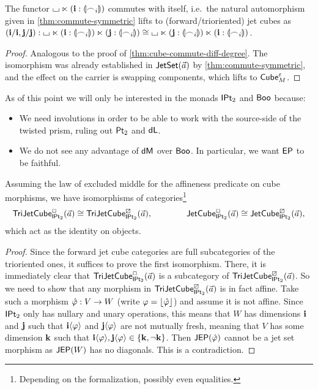 \documentclass[a4paper]{article}
\begin{document}
\begin{proposition} \label{thm:cube-commute-symmetric}
	The functor ${\llcorner\hspace{-.4ex}\lrcorner} \ltimes (\mathbf{i} : {\llparenthesis \frown_i \rrparenthesis})$ commutes with itself, i.e.\ the natural automorphism given in \cref{thm:commute-symmetric} lifts to (forward/trioriented) jet cubes as $(\mathbf{i} / \mathbf{i}, \mathbf{j} / \mathbf{j}) : {\llcorner\hspace{-.4ex}\lrcorner} \ltimes (\mathbf{i} : {\llparenthesis \frown_i \rrparenthesis}) \ltimes (\mathbf{j} : {\llparenthesis \frown_i \rrparenthesis}) \cong {\llcorner\hspace{-.4ex}\lrcorner} \ltimes (\mathbf{j} : {\llparenthesis \frown_i \rrparenthesis}) \ltimes (\mathbf{i} : {\llparenthesis \frown_i \rrparenthesis})$.
\end{proposition}
\begin{proof}
	Analogous to the proof of \cref{thm:cube-commute-diff-degree}.
	The isomorphism was already established in $\mathsf{JetSet}(\vec a)$ by \cref{thm:commute-symmetric}, and the effect on the carrier is swapping components, which lifts to ${\mathsf{Cube}}_M^\varepsilon$.
\end{proof}
\begin{remark} \label{rem:two-monads}
	As of this point we will only be interested in the monads ${\mathsf{IPt}_2}$ and $\mathsf{Boo}$ because:
	\begin{itemize}
		\item We need involutions in order to be able to work with the source-side of the twisted prism, ruling out ${\mathsf{Pt}_2}$ and $\mathsf{dL}$.
		\item We do not see any advantage of $\mathsf{dM}$ over $\mathsf{Boo}$. In particular, we want $\mathsf{EP}$ to be faithful.
	\end{itemize}
\end{remark}
\begin{theorem} \label{thm:affine-automatic}
	Assuming the law of excluded middle for the affineness predicate on cube morphisms, we have isomorphisms of categories\footnote{Depending on the formalization, possibly even equalities.}
	\[
		\mathsf{TriJetCube}^{\Box}_{{\mathsf{IPt}_2}}\mathopen{}\left( \vec a \right)\mathclose{} \cong \mathsf{TriJetCube}^{\boxslash}_{{\mathsf{IPt}_2}}\mathopen{}\left( \vec a \right)\mathclose{},
		\qquad \qquad
		\mathsf{JetCube}^{\Box}_{{\mathsf{IPt}_2}}\mathopen{}\left( \vec a \right)\mathclose{} \cong \mathsf{JetCube}^{\boxslash}_{{\mathsf{IPt}_2}}\mathopen{}\left( \vec a \right)\mathclose{},
	\]
	which act as the identity on objects.
\end{theorem}
\begin{proof}
	Since the forward jet cube categories are full subcategories of the trioriented ones, it suffices to prove the first isomorphism.
	There, it is immediately clear that $\mathsf{TriJetCube}^{\Box}_{{\mathsf{IPt}_2}}\mathopen{}\left( \vec a \right)\mathclose{}$ is a subcategory of $\mathsf{TriJetCube}^{\boxslash}_{{\mathsf{IPt}_2}}\mathopen{}\left( \vec a \right)\mathclose{}$.
	So we need to show that any morphism in $\mathsf{TriJetCube}^{\boxslash}_{{\mathsf{IPt}_2}}\mathopen{}\left( \vec a \right)\mathclose{}$ is in fact affine.
	Take such a morphism $\hat {\varphi} : V \to W$ (write $\varphi = \mathopen{}\left\lfloor \hat {\varphi} \right\rfloor\mathclose{}$) and assume it is not affine.
	Since ${\mathsf{IPt}_2}$ only has nullary and unary operations, this means that $W$ has dimensions $\mathbf{i}$ and $\mathbf{j}$ such that $\mathbf{i} \langle \varphi \rangle$ and $\mathbf{j} \langle \varphi \rangle$ are not mutually fresh, meaning that $V$ has some dimension $\mathbf{k}$ such that $\mathbf{i} \langle \varphi \rangle, \mathbf{j} \langle \varphi \rangle \in \mathopen{}\left\{ \mathbf{k}, \lnot \mathbf{k} \right\}\mathclose{}$.
	Then $\mathsf{JEP}(\hat {\varphi})$ cannot be a jet set morphism as $\mathsf{JEP}(W)$ has no diagonals. This is a contradiction.
\end{proof}
\end{document}
